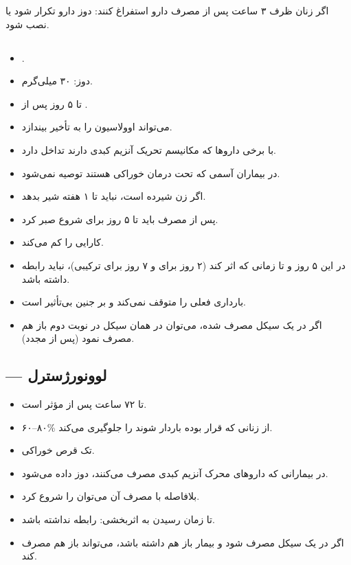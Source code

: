 \documentclass[12pt,a4paper]{article}
\begin{document}
اگر زنان ظرف ۳ ساعت پس از مصرف دارو استفراغ کنند: دوز دارو تکرار شود یا  نصب شود.

\subsection*{}
\begin{itemize}
  \item {}.
  \item دوز: ۳۰ میلی‌گرم.
  \item تا ۵ روز پس از .
  \item می‌تواند اوولاسیون را به تأخیر بیندازد.
  \item با برخی داروها که مکانیسم تحریک آنزیم کبدی دارند تداخل دارد.
  \item در بیماران آسمی که تحت درمان  خوراکی هستند توصیه نمی‌شود.
  \item اگر زن شیرده است، نباید تا ۱ هفته شیر بدهد.
  \item پس از مصرف  باید تا ۵ روز برای شروع  صبر کرد.
  \item {} کارایی  را کم می‌کند.
  \item در این ۵ روز و تا زمانی که  اثر کند (۲ روز برای  و ۷ روز برای ترکیبی)، نباید رابطه داشته باشد.
  \item بارداری فعلی را متوقف نمی‌کند و بر جنین بی‌تأثیر است.
  \item اگر در یک سیکل  مصرف شده، می‌توان در همان سیکل در نوبت دوم باز هم مصرف نمود (پس از  مجدد).
\end{itemize}

\subsection*{ — لوونورژسترل}
\begin{itemize}
  \item تا ۷۲ ساعت پس از  مؤثر است.
  \item ۶۰–۸۰\% از زنانی که قرار بوده باردار شوند را جلوگیری می‌کند.
  \item تک قرص  خوراکی.
  \item در بیمارانی که داروهای محرک آنزیم کبدی مصرف می‌کنند، دوز  داده می‌شود.
  \item بلافاصله با مصرف آن می‌توان  را شروع کرد.
  \item تا زمان رسیدن  به اثربخشی: رابطه نداشته باشد.
  \item اگر در یک سیکل مصرف شود و بیمار باز هم  داشته باشد، می‌تواند باز هم  مصرف کند.
\end{itemize}
\end{document}
